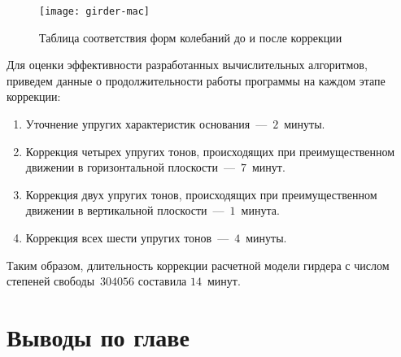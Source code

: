 \begin{figure}[!htb]
	\centering
	\texttt{[image: girder-mac]}
	\caption{Таблица соответствия форм колебаний до и после коррекции} \label{fig:girder-mac}
\end{figure}

Для оценки эффективности разработанных вычислительных алгоритмов, приведем данные о продолжительности работы программы на каждом этапе коррекции:
\begin{enumerate}
	\item Уточнение упругих характеристик основания~---~$ 2 $~минуты.
	\item Коррекция четырех упругих тонов, происходящих при преимущественном движении в горизонтальной плоскости~---~$ 7 $~минут.
	\item Коррекция двух упругих тонов, происходящих при преимущественном движении в вертикальной плоскости~---~$ 1 $~минута.
	\item Коррекция всех шести упругих тонов~---~$ 4 $~минуты.
\end{enumerate}

Таким образом, длительность коррекции расчетной модели гирдера с числом степеней свободы~$ 304056 $ составила $ 14 $~минут. 

\section{Выводы по главе \thechapter}

